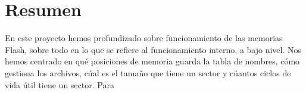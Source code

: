 \chapter*{Resumen}

En este proyecto hemos profundizado sobre funcionamiento de las memorias Flash, sobre todo en lo que se refiere al funcionamiento interno, a bajo nivel. Nos hemos centrado en qué posiciones de memoria guarda la tabla de nombres, cómo gestiona los archivos, cúal es el tamaño que tiene un sector y cúantos ciclos de vida útil tiene un sector. Para 
